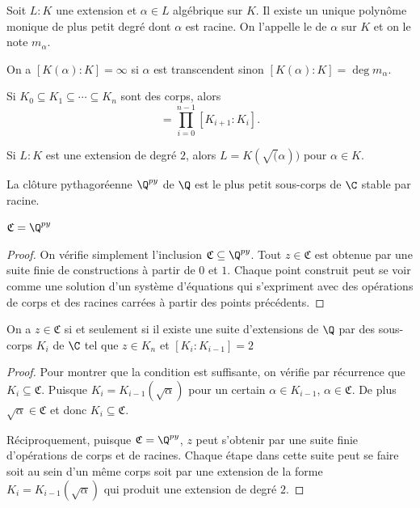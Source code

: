 \documentclass[math, info]{mpb-cours}
\def\fC{\mathfrak{C}}
\begin{document}
\begin{definition}
	Soit $L:K$ une extension et $\alpha \in L$ algébrique sur $K$. Il existe un unique polynôme monique de
	plus petit degré dont $\alpha$ est racine.
	On l'appelle le  de $\alpha$ sur $K$ et on le note $m_{\alpha}$.
\end{definition}

\begin{thm}
	On a $[K(\alpha):K] = \infty$ si $\alpha$ est transcendent sinon $[K(\alpha):K] = \deg m_{\alpha}$.
\end{thm}

\begin{proposition}
	Si $K_{0} \subseteq K_{1} \subseteq \cdots \subseteq K_{n}$ sont des corps, alors
	\begin{equation*}
		[K_{n}:K_{0}] = \prod_{i = 0}^{n-1} [K_{i + 1}:K_{i}].
	\end{equation*}
\end{proposition}

\begin{proposition}
	Si $L:K$ est une extension de degré $2$, alors $L = K(\sqrt(\alpha))$ pour $\alpha \in K$.
\end{proposition}

\begin{definition}
	La clôture pythagoréenne $\Q^{py}$ de $\Q$ est le plus petit sous-corps de $\C$ stable par racine.
\end{definition}

\begin{thm}
	$\fC = \Q^{py}$
\end{thm}
\begin{proof}
	On vérifie simplement l'inclusion $\fC \subseteq \Q^{py}$.
	Tout $z \in \fC$ est obtenue par une suite finie de constructions à partir de $0$ et $1$.
	Chaque point construit peut se voir comme une solution d'un système d'équations qui s'expriment avec des
	opérations de corps et des racines carrées à partir des points précédents.
\end{proof}

\begin{thm}
	On a $z \in \fC$ si et seulement si il existe une suite d'extensions de $\Q$ par des sous-corps $K_{i}$
	de $\C$ tel que $z \in K_{n}$ et $[K_{i}:K_{i-1}] = 2$
\end{thm}

\begin{proof}
	Pour montrer que la condition est suffisante, on vérifie par récurrence que $K_{i} \subseteq \fC$.
	Puisque $K_{i} = K_{i - 1}(\sqrt{\alpha})$ pour un certain $\alpha \in K_{i - 1}$, $\alpha \in \fC$.
	De plus $\sqrt{\alpha} \in \fC$ et donc $K_{i} \subseteq \fC$.

	Réciproquement, puisque $\fC = \Q^{py}$, $z$ peut s'obtenir par une suite finie d'opérations de corps
	et de racines. Chaque étape dans cette suite peut se faire soit au sein d'un même corps soit par une
	extension de la forme $K_{i} = K_{i - 1}(\sqrt{\alpha})$ qui produit une extension de degré $2$.
\end{proof}
\end{document}
